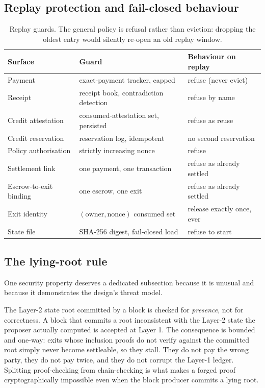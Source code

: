 \documentclass{article}
\begin{document}
\subsection{Replay protection and fail-closed behaviour}

\begin{table}[t]
\centering
\begin{tabular}{lll}
\toprule
\textbf{Surface} & \textbf{Guard} & \textbf{Behaviour on replay} \\
\midrule
Payment & exact-payment tracker, capped & refuse (never evict) \\
Receipt & receipt book, contradiction detection & refuse by name \\
Credit attestation & consumed-attestation set, persisted & refuse as reuse \\
Credit reservation & reservation log, idempotent & no second reservation \\
Policy authorisation & strictly increasing nonce & refuse \\
Settlement link & one payment, one transaction & refuse as already settled \\
Escrow-to-exit binding & one escrow, one exit & refuse as already settled \\
Exit identity & $(\text{owner},\text{nonce})$ consumed set & release exactly
  once, ever \\
State file & SHA-256 digest, fail-closed load & refuse to start \\
\bottomrule
\end{tabular}
\caption{Replay guards. The general policy is refusal rather than eviction:
dropping the oldest entry would silently re-open an old replay window.}
\label{tab:replay}
\end{table}

\subsection{The lying-root rule}
\label{sec:lyingroot}

One security property deserves a dedicated subsection because it is unusual and
because it demonstrates the design's threat model.

The Layer-2 state root committed by a block is checked for \emph{presence},
not for correctness. A block that commits a root inconsistent with the
Layer-2 state the proposer actually computed is accepted at Layer 1. The
consequence is bounded and one-way: exits whose inclusion proofs do not verify
against the committed root simply never become settleable, so they stall.
They do not pay the wrong party, they do not pay twice, and they do not corrupt
the Layer-1 ledger. Splitting proof-checking from chain-checking is what makes
a forged proof cryptographically impossible even when the block producer
commits a lying root.
\end{document}
